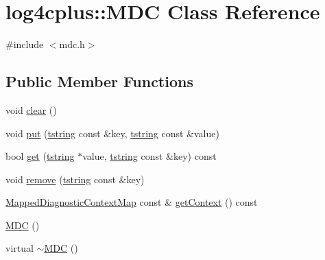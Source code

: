 \hypertarget{classlog4cplus_1_1MDC}{\section{log4cplus\-:\-:M\-D\-C Class Reference}
\label{classlog4cplus_1_1MDC}
}


{\ttfamily \#include $<$mdc.\-h$>$}

\subsection*{Public Member Functions}
\begin{DoxyCompactItemize}
\item 
void \hyperlink{classlog4cplus_1_1MDC_a0586b60da628d0fde325c68eebcc6460}{clear} ()
\item 
void \hyperlink{classlog4cplus_1_1MDC_a1a12c471544f8803f9d41b4b83196dec}{put} (\hyperlink{namespacelog4cplus_a3c9287f6ebcddc50355e29d71152117b}{tstring} const \&key, \hyperlink{namespacelog4cplus_a3c9287f6ebcddc50355e29d71152117b}{tstring} const \&value)
\item 
bool \hyperlink{classlog4cplus_1_1MDC_a00600236ef5a85abafd703cbba6008c8}{get} (\hyperlink{namespacelog4cplus_a3c9287f6ebcddc50355e29d71152117b}{tstring} $\ast$value, \hyperlink{namespacelog4cplus_a3c9287f6ebcddc50355e29d71152117b}{tstring} const \&key) const 
\item 
void \hyperlink{classlog4cplus_1_1MDC_acb93bc9d4ff26918d1388676dccd66dc}{remove} (\hyperlink{namespacelog4cplus_a3c9287f6ebcddc50355e29d71152117b}{tstring} const \&key)
\item 
\hyperlink{namespacelog4cplus_a8b5b860e781a3d8d5c3d7d743a630b8a}{Mapped\-Diagnostic\-Context\-Map} const \& \hyperlink{classlog4cplus_1_1MDC_af4e53386502f01c1a6c4c7f6448111b0}{get\-Context} () const 
\item 
\hyperlink{classlog4cplus_1_1MDC_a7cbd6fdc8fb718005b39275aa78dc11d}{M\-D\-C} ()
\item 
virtual \hyperlink{classlog4cplus_1_1MDC_a4d08f44d97f13fbe83ab87fee9db5ab1}{$\sim$\-M\-D\-C} ()
\end{DoxyCompactItemize}


